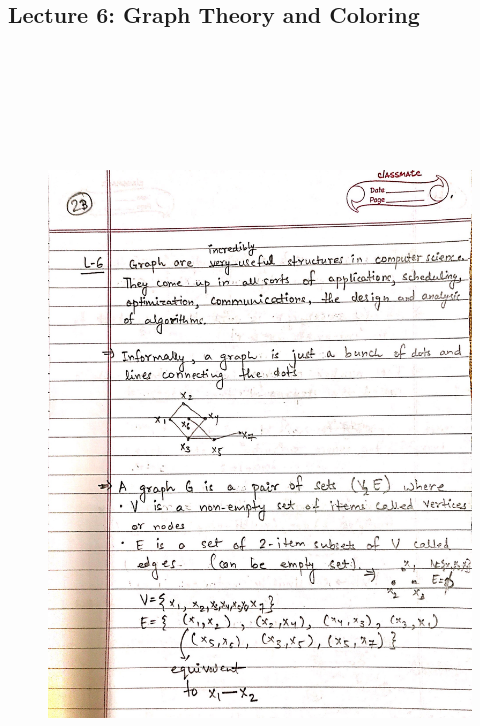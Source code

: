 {\color{black} \subsection*{Lecture 6: Graph Theory and Coloring}}
\begin{figure}[H]
    \centering
    \includegraphics[width=16cm, height=21cm]{"./MIT-6.042J/MIT-6042J-023"}
\end{figure}

